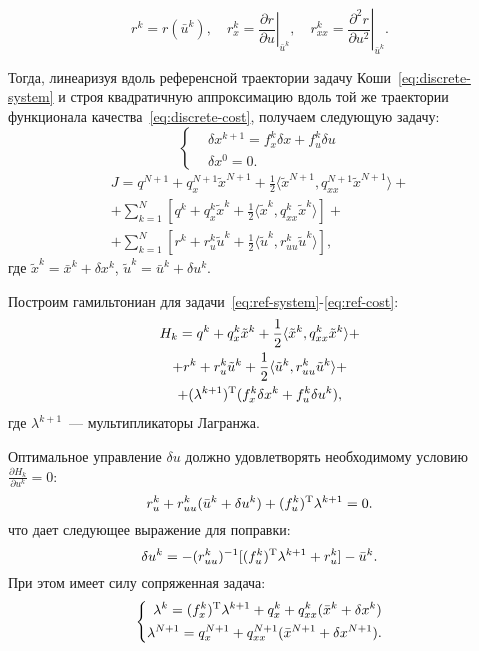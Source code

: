 $$
    r^k = r(\bar u^k),
    \quad
    r_x^k = \left.\frac{\partial r}{\partial u}\right|_{\bar u^k},
    \quad
    r_{xx}^k = \left.\frac{\partial^2 r}{\partial u^2}\right|_{\bar u^k}.
$$

Тогда, линеаризуя вдоль референсной траектории задачу Коши~\eqref{eq:discrete-system} и строя квадратичную аппроксимацию вдоль той же траектории функционала качества~\eqref{eq:discrete-cost}, получаем следующую задачу:
\begin{equation}\label{eq:ref-system}
    \left\{\begin{aligned}
        &\delta x^{k+1} = f_x^k \delta x + f_u^k \delta u \\
        &\delta x^0 = 0.
    \end{aligned}\right.
\end{equation}
\begin{multline}\label{eq:ref-cost}
    J = q^{N+1} + q_x^{N+1}\tilde x^{N+1} + \frac{1}{2}\langle \tilde x^{N+1}, q_{xx}^{N+1}\tilde x^{N+1} \rangle
    + \\ +
    \sum_{k=1}^{N}\left[ q^{k} + q_x^{k}\tilde x^{k} + \frac{1}{2}\langle \tilde x^{k}, q_{xx}^{k}\tilde x^{k} \rangle \right]
    + \\ +
    \sum_{k=1}^{N}\left[ r^{k} + r_u^{k}\tilde u^{k} + \frac{1}{2}\langle \tilde u^{k}, r_{uu}^{k}\tilde u^{k} \rangle \right],
\end{multline}
где $\tilde x^k = \bar x^k + \delta x^k$, $\tilde u^k = \bar u^k + \delta u^k$.

Построим гамильтониан для задачи~\eqref{eq:ref-system}-\eqref{eq:ref-cost}:
\begin{multline}
    H_k = q^{k} + q_x^{k}\tilde x^{k} + \frac{1}{2}\langle \tilde x^{k}, q_{xx}^{k}\tilde x^{k} \rangle
    +\\+
    r^{k} + r_u^{k}\tilde u^{k} + \frac{1}{2}\langle \tilde u^{k}, r_{uu}^{k}\tilde u^{k} \rangle
    +\\+
    (\lambda^{k+1})^\mathrm{T} (f_x^k \delta x^k + f_u^k \delta u^k),
\end{multline}
где $\lambda^{k+1}$~--- мультипликаторы Лагранжа.

Оптимальное управление $\delta u$ должно удовлетворять необходимому условию $\frac{\partial H_k}{\partial u^k} = 0$:
\begin{equation*}
    r_u^k + r_{uu}^k(\bar u^k + \delta u^k) + (f_u^k)^\mathrm{T}\lambda^{k+1} = 0.
\end{equation*}
что дает следующее выражение для поправки:
\begin{equation}\label{eq:delta-u}
    \delta u^k = - (r_{uu}^k)^{-1}[(f_u^k)^\mathrm{T}\lambda^{k+1} + r_u^k] - \bar u^k.
\end{equation}
При этом имеет силу сопряженная задача:
\begin{equation}\label{eq:lambda-system}
    \left\{\begin{aligned}
        \lambda^k = (f_x^k)^\mathrm{T} \lambda^{k+1} + q_x^k + q_{xx}^k(\bar x^k + \delta x^k)
        \\
        \lambda^{N+1} = q_x^{N+1} + q_{xx}^{N+1}(\bar x^{N+1} + \delta x^{N+1})
        .
    \end{aligned}\right.
\end{equation}

